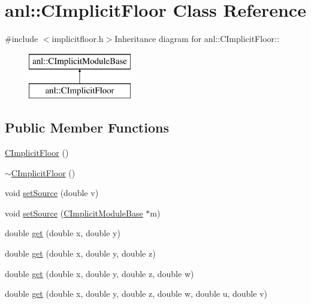 \hypertarget{classanl_1_1CImplicitFloor}{
\section{anl::CImplicitFloor Class Reference}
\label{classanl_1_1CImplicitFloor}
}


{\ttfamily \#include $<$implicitfloor.h$>$}Inheritance diagram for anl::CImplicitFloor::\begin{figure}[H]
\begin{center}
\leavevmode
\includegraphics[height=2cm]{classanl_1_1CImplicitFloor}
\end{center}
\end{figure}
\subsection*{Public Member Functions}
\begin{DoxyCompactItemize}
\item 
\hyperlink{classanl_1_1CImplicitFloor_adeaeb85e37f0616366cea63e0d23c027}{CImplicitFloor} ()
\item 
\hyperlink{classanl_1_1CImplicitFloor_a3e314e1ec4040391b32f809cf5776958}{$\sim$CImplicitFloor} ()
\item 
void \hyperlink{classanl_1_1CImplicitFloor_a2b85a90fdb4aaa31c2c8b97567ef8d98}{setSource} (double v)
\item 
void \hyperlink{classanl_1_1CImplicitFloor_a033bd866e4b67b9cb54a685e1f1f9cf5}{setSource} (\hyperlink{classanl_1_1CImplicitModuleBase}{CImplicitModuleBase} $\ast$m)
\item 
double \hyperlink{classanl_1_1CImplicitFloor_ad2a70f69657f5e662ce91f45e3a84a75}{get} (double x, double y)
\item 
double \hyperlink{classanl_1_1CImplicitFloor_ae73876cea1480c84adc05b83cca26255}{get} (double x, double y, double z)
\item 
double \hyperlink{classanl_1_1CImplicitFloor_ae6b0c4cf4b5616de73ff319cc976e701}{get} (double x, double y, double z, double w)
\item 
double \hyperlink{classanl_1_1CImplicitFloor_af923d68186937208d6d877f69c1ab2dc}{get} (double x, double y, double z, double w, double u, double v)
\end{DoxyCompactItemize}
